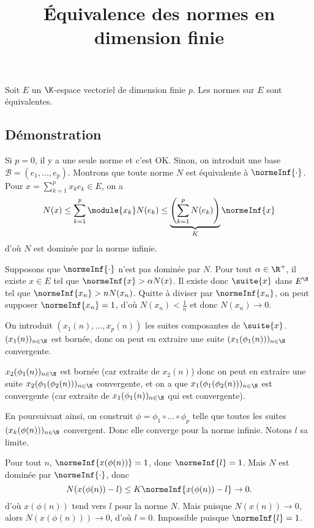 \documentclass[fontsize=12pt,twoside=false,parskip=half,french]{scrartcl}
\title{Équivalence des normes en dimension finie}
\date{}
\author{}
\begin{document}
\maketitle
   \begin{Theoreme}
      Soit $E$ un $\K$-espace vectoriel de dimension finie $p$. Les normes
      sur $E$ sont équivalentes.
   \end{Theoreme}
   \subsection{Démonstration}
      Si $p = 0$, il y a une seule norme et c'est OK. Sinon, on introduit une base
      $\mathcal{B} = (e_1, \ldots, e_p)$. Montrons que toute norme $N$
      est équivalente à $\normeInf{\cdot}$. Pour $x = \sum_{k = 1}^p x_ke_k \in E$, on a
      \[
         N(x) \leq \sum_{k = 1}^p \module{x_k}N(e_k)
              \leq \underbrace{\left(\sum_{k = 1}^p N(e_k)\right)}_{K} \normeInf{x}
      \]
      d'où $N$ est dominée par la norme infinie.

      Supposons que $\normeInf{\cdot}$ n'est pas dominée par $N$.
      Pour tout $\alpha \in \R^+$, il existe $x \in E$ tel que
      $\normeInf{x} > \alpha N(x)$. Il existe donc $\suite{x}$ dans $E^{\N}$
      tel que $\normeInf{x_n} > nN(x_n)$. Quitte à diviser par
      $\normeInf{x_n}$, on peut supposer $\normeInf{x_n} = 1$, d'où
      $N(x_n) < \frac{1}{n}$ et donc $N(x_n) \to 0$.

      On introduit $(x_1(n), \ldots, x_p(n))$ les suites composantes de $\suite{x}$.
      $(x_1(n))_{n \in \N}$ est bornée, donc on peut en extraire une suite
      $(x_1(\phi_1(n)))_{n \in \N}$ convergente.

      $x_2(\phi_1(n))_{n \in \N}$ est bornée (car extraite de $x_2(n)$)
      donc on peut en extraire une suite $x_2(\phi_1(\phi_2(n)))_{n \in \N}$
      convergente, et on a que $x_1(\phi_1(\phi_2(n)))_{n \in \N}$ est convergente
      (car extraite de $x_1(\phi_1(n))_{n \in \N}$ qui est convergente).

      En poursuivant ainsi, on construit $\phi = \phi_1 \circ \ldots \circ \phi_p$
      telle que toutes les suites $(x_k(\phi(n)))_{n \in \N}$ convergent. Donc
      elle converge pour la norme infinie. Notons $l$ sa limite.

      Pour tout $n$, $\normeInf{x(\phi(n))} = 1$, donc $\normeInf{l} = 1$.
      Mais $N$ est dominée par $\normeInf{\cdot}$, donc
      \[
         N(x(\phi(n)) - l) \leq K\normeInf{x(\phi(n)) - l} \to 0.
      \]
      d'où $x(\phi(n))$ tend vers $l$ pour la norme $N$. Mais puisque
      $N(x(n)) \to 0$, alors $N(x(\phi(n))) \to 0$, d'où $l = 0$. Impossible
      puisque $\normeInf{l} = 1$.
\end{document}
